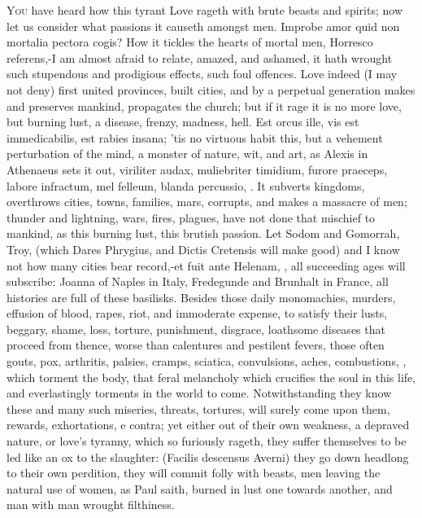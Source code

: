 {\lettrine{Y}{ou} have heard how this tyrant Love rageth with brute beasts and
spirits; now let us consider what passions it causeth amongst men.
Improbe amor quid non mortalia pectora cogis? How it tickles the
hearts of mortal men, Horresco referens,-I am almost afraid to relate,
amazed, and ashamed, it hath wrought such stupendous and
prodigious effects, such foul offences. Love indeed (I may not deny)
first united provinces, built cities, and by a perpetual generation
makes and preserves mankind, propagates the church; but if it rage it
is no more love, but burning lust, a disease, frenzy, madness, hell.
Est orcus ille, vis est immedicabilis, est rabies insana; 'tis no
virtuous habit this, but a vehement perturbation of the mind, a monster
of nature, wit, and art, as Alexis in Athenaeus sets it out,
viriliter audax, muliebriter timidium, furore praeceps, labore
infractum, mel felleum, blanda percussio, \etc{}. It subverts kingdoms,
overthrows cities, towns, families, mars, corrupts, and makes a
massacre of men; thunder and lightning, wars, fires, plagues, have not
done that mischief to mankind, as this burning lust, this brutish
passion. Let Sodom and Gomorrah, Troy, (which Dares Phrygius, and
Dictis Cretensis will make good) and I know not how many cities bear
record,-et fuit ante Helenam, \etc{}, all succeeding ages will subscribe:
Joanna of Naples in Italy, Fredegunde and Brunhalt in France, all
histories are full of these basilisks. Besides those daily monomachies,
murders, effusion of blood, rapes, riot, and immoderate expense, to
satisfy their lusts, beggary, shame, loss, torture, punishment,
disgrace, loathsome diseases that proceed from thence, worse than
calentures and pestilent fevers, those often gouts, pox, arthritis,
palsies, cramps, sciatica, convulsions, aches, combustions, \etc{}, which
torment the body, that feral melancholy which crucifies the soul in
this life, and everlastingly torments in the world to come.
Notwithstanding they know these and many such miseries, threats,
tortures, will surely come upon them, rewards, exhortations, e contra;
yet either out of their own weakness, a depraved nature, or love's
tyranny, which so furiously rageth, they suffer themselves to be led
like an ox to the slaughter: (Facilis descensus Averni) they go down
headlong to their own perdition, they will commit folly with beasts,
men leaving the natural use of women, as Paul saith, burned in
lust one towards another, and man with man wrought filthiness.
}
